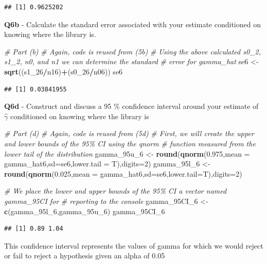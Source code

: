 \documentclass[
]{article}
\newenvironment{Shaded}{\begin{snugshade}}{\end{snugshade}}
\newcommand{\AttributeTok}[1]{\textcolor[rgb]{0.13,0.29,0.53}{#1}}
\newcommand{\CommentTok}[1]{\textcolor[rgb]{0.56,0.35,0.01}{\textit{#1}}}
\newcommand{\DecValTok}[1]{\textcolor[rgb]{0.00,0.00,0.81}{#1}}
\newcommand{\FloatTok}[1]{\textcolor[rgb]{0.00,0.00,0.81}{#1}}
\newcommand{\FunctionTok}[1]{\textcolor[rgb]{0.13,0.29,0.53}{\textbf{#1}}}
\newcommand{\NormalTok}[1]{#1}
\newcommand{\OtherTok}[1]{\textcolor[rgb]{0.56,0.35,0.01}{#1}}
\newcommand{\SpecialCharTok}[1]{\textcolor[rgb]{0.81,0.36,0.00}{\textbf{#1}}}
\begin{document}
\begin{verbatim}
## [1] 0.9625202
\end{verbatim}

\hfill\break
\hfill\break
\textbf{Q6b} - Calculate the standard error associated with your
estimate conditioned on knowing where the library is.\\

\begin{Shaded}
\begin{Highlighting}[]
\CommentTok{\# Part (b)}
\CommentTok{\# Again, code is reused from (5b)}
\CommentTok{\# Using the above calculated s0\_2, s1\_2, n0, and n1 we can determine the standard}
\CommentTok{\# error for gamma\_hat}
\NormalTok{se6 }\OtherTok{\textless{}{-}} \FunctionTok{sqrt}\NormalTok{((s1\_26}\SpecialCharTok{/}\NormalTok{n16)}\SpecialCharTok{+}\NormalTok{(s0\_26}\SpecialCharTok{/}\NormalTok{n06))}
\NormalTok{se6}
\end{Highlighting}
\end{Shaded}

\begin{verbatim}
## [1] 0.03841955
\end{verbatim}

\hfill\break
\hfill\break
\textbf{Q6d} - Construct and discuss a 95 \% confidence interval around
your estimate of \(\hat{\gamma}\) conditioned on knowing where the
library is\\

\begin{Shaded}
\begin{Highlighting}[]
\CommentTok{\# Part (d)}
\CommentTok{\# Again, code is reused from (5d)}
\CommentTok{\# First, we will create the upper and lower bounds of the 95\% CI using the qnorm}
\CommentTok{\# function measured from the lower tail of the distribution}
\NormalTok{gamma\_95u\_6 }\OtherTok{\textless{}{-}} \FunctionTok{round}\NormalTok{(}\FunctionTok{qnorm}\NormalTok{(}\FloatTok{0.975}\NormalTok{,}\AttributeTok{mean =}\NormalTok{ gamma\_hat6,}\AttributeTok{sd=}\NormalTok{se6,}\AttributeTok{lower.tail =}\NormalTok{ T),}\AttributeTok{digits=}\DecValTok{2}\NormalTok{)}
\NormalTok{gamma\_95l\_6 }\OtherTok{\textless{}{-}} \FunctionTok{round}\NormalTok{(}\FunctionTok{qnorm}\NormalTok{(}\FloatTok{0.025}\NormalTok{,}\AttributeTok{mean =}\NormalTok{ gamma\_hat6,}\AttributeTok{sd=}\NormalTok{se6,}\AttributeTok{lower.tail=}\NormalTok{T),}\AttributeTok{digits=}\DecValTok{2}\NormalTok{)}

\CommentTok{\# We place the lower and upper bounds of the 95\% CI a vector named \textquotesingle{}gamma\_95CI\textquotesingle{} for}
\CommentTok{\# reporting to the console}
\NormalTok{gamma\_95CI\_6 }\OtherTok{\textless{}{-}} \FunctionTok{c}\NormalTok{(gamma\_95l\_6,gamma\_95u\_6)}
\NormalTok{gamma\_95CI\_6}
\end{Highlighting}
\end{Shaded}

\begin{verbatim}
## [1] 0.89 1.04
\end{verbatim}

\hfill\break
This confidence interval represents the values of gamma for which we
would reject or fail to reject a hypothesis given an alpha of 0.05\\
\strut \\
\end{document}
